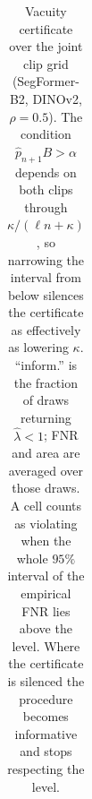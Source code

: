 \begin{table}[t]
\begin{tabular}{lccccccccc}
\bottomrule
\end{tabular}
\caption{Vacuity certificate over the joint clip grid (SegFormer-B2, DINOv2, $\rho=0.5$). The condition $\hat{p}_{n+1}B > \alpha$ depends on both clips through $\kappa/(\ell n+\kappa)$, so narrowing the interval from below silences the certificate as effectively as lowering $\kappa$. ``inform.'' is the fraction of draws returning $\hat{\lambda} < 1$; FNR and area are averaged over those draws. A cell counts as violating when the whole $95\%$ interval of the empirical FNR lies above the level. Where the certificate is silenced the procedure becomes informative and stops respecting the level.}
\label{tab:clip_grid}
\end{table}
